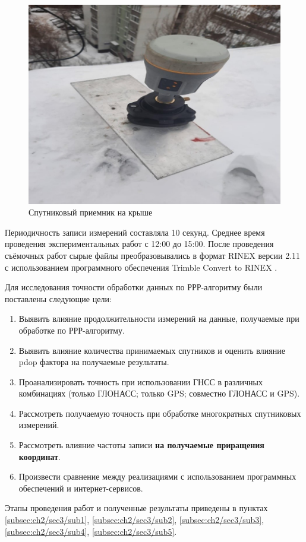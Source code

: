 \begin{figure}[h]
	\centering
	\includegraphics[width=0.7\linewidth]{images/pic08}
	\caption{Спутниковый приемник на крыше}
	\label{fig:pic08}
\end{figure}

Периодичность записи измерений составляла 10 секунд.  Среднее время проведения экспериментальных работ с 12:00 до 15:00. После проведения съёмочных работ сырые файлы преобразовывались в формат RINEX версии 2.11 с использованием программного обеспечения Trimble Convert to RINEX \cite{src84}. 

Для исследования точности обработки данных по РРР-алгоритму были поставлены следующие цели:

\begin{enumerate}
	\item Выявить влияние продолжительности измерений на данные, получаемые при обработке по РРР-алгоритму. 
	\item Выявить влияние количества принимаемых спутников и оценить влияние pdop фактора на получаемые результаты.
	\item Проанализировать точность при использовании ГНСС в различных комбинациях (только ГЛОНАСС; только GPS; совместно ГЛОНАСС и GPS).
	\item Рассмотреть получаемую точность при обработке многократных спутниковых измерений.
	\item Рассмотреть влияние частоты записи \textbf{на получаемые приращения координат}.
	\item Произвести сравнение между реализациями с использованием программных обеспечений и интернет-сервисов.
\end{enumerate}

Этапы проведения работ и полученные результаты приведены в пунктах \cref{subsec:ch2/sec3/sub1}, \cref{subsec:ch2/sec3/sub2}, \cref{subsec:ch2/sec3/sub3}, \cref{subsec:ch2/sec3/sub4}, \cref{subsec:ch2/sec3/sub5}.




